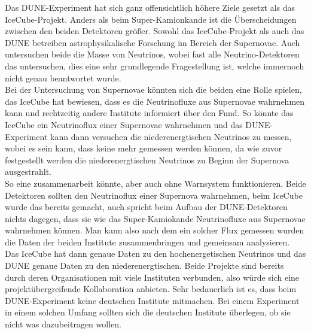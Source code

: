 Das DUNE-Experiment hat sich ganz offensichtlich höhere Ziele gesetzt als das IceCube-Projekt. Anders als beim
Super-Kamionkande ist die Überscheidungen zwischen den beiden Detektoren größer. Sowohl das IceCube-Projekt als
auch das DUNE betreiben astrophysikalische Forschung im Bereich der Supernovae. Auch untersuchen beide die Masse
von Neutrinos, wobei fast alle Neutrino-Detektoren das untersuchen, dies eine sehr grundlegende Fragestellung ist, 
welche immernoch nicht genau beantwortet wurde. \\
Bei der Untersuchung von Supernovae könnten sich die beiden eine Rolle spielen, das IceCube hat bewiesen, dass es die
Neutrinofluxe aus Supernovae wahrnehmen kann und rechtzeitig andere Institute informiert über den Fund. So könnte
das IceCube ein Neutrinoflux einer Supernovae wahrnehmen und das DUNE-Experiment kann dann versuchen die niederenergtischen
Neutrinos zu messen, wobei es sein kann, dass keine mehr gemessen werden können, da wie zuvor festgestellt werden die niederenergtischen
Neutrinos zu Beginn der Supernova ausgestrahlt. \\
So eine zusammenarbeit könnte, aber auch ohne Warnsystem funktionieren. Beide Detektoren sollten den Neutrinoflux einer
Supernova wahrnehmen, beim IceCube wurde das bereits gemacht, auch spricht beim Aufbau der DUNE-Detektoren nichts dagegen, dass
sie wie das Super-Kamiokande Neutrinofluxe aus Supernovae wahrnehmen können. Man kann also nach dem ein solcher Flux gemessen wurden
die Daten der beiden Institute zusammenbringen und gemeinsam analysieren. Das IceCube hat dann genaue Daten zu den hochenergetischen Neutrinos 
und das DUNE genaue Daten zu den niederenergtischen. Beide Projekte sind bereits durch deren Organisationen mit viele Instituten 
verbunden, also würde sich eine projektübergreifende Kollaboration anbieten. 
Sehr bedauerlich ist es, dass beim DUNE-Experiment keine deutschen Institute mitmachen. Bei einem Experiment in einem solchen
Umfang sollten sich die deutschen Institute überlegen, ob sie nicht was dazubeitragen wollen.